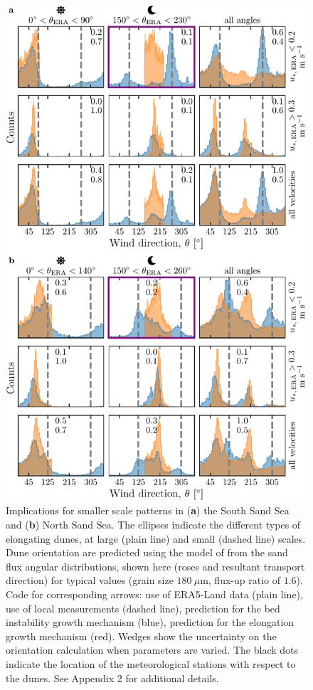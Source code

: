 \begin{figure}
\centering
\includegraphics[scale=1]{Figures/Figure6.pdf}
\caption{Implications for smaller scale patterns in (\textbf{a}) the South Sand Sea and (\textbf{b}) North Sand Sea. The ellipses indicate the different types of elongating dunes, at large (plain line) and small (dashed line) scales. Dune orientation are predicted using the model of \citet{Courrech2014} from the sand flux angular distributions, shown here (roses and resultant transport direction) for typical values (grain size $180~\mu$m, flux-up ratio of $1.6$). Code for corresponding arrows: use of ERA5-Land data (plain line), use of local measurements (dashed line), prediction for the bed instability growth mechanism (blue), prediction for the elongation growth mechanism (red). Wedges show the uncertainty on the orientation calculation when parameters are varied. The black dots indicate the location of the meteorological stations with respect to the dunes. See Appendix 2 for additional details.}
\label{Fig6}
\end{figure}


